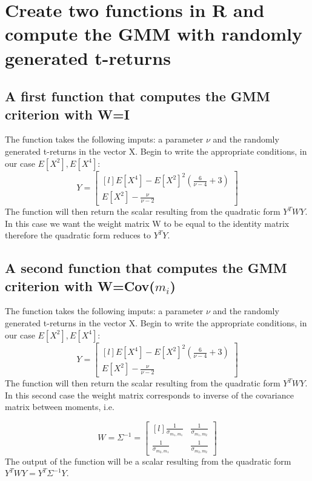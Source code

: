 \section{Create two functions in R and compute the GMM with randomly generated t-returns}

\subsection{A first function that computes the GMM criterion with W=I}
The function takes the following imputs: a parameter $\nu$ and the randomly generated t-returns in the vector X. Begin to write the appropriate conditions, in our case $E[X^2], E[X^4]$:
\begin{equation*}
    Y=    
    \begin{bmatrix}[l]
    E[X^4]-E[X^2]^2(\frac{6}{\nu-4}+3)  \\
    E[X^2]-\frac{\nu}{\nu-2}
    \end{bmatrix}
\end{equation*}
The function will then return the scalar resulting from the quadratic form $Y^TWY$. In this case we want the weight matrix W to be equal to the identity matrix therefore the quadratic form reduces to $Y^TY$.


\subsection{A second function that computes the GMM criterion with W=Cov($m_i$)}
The function takes the following imputs: a parameter $\nu$ and the randomly generated t-returns in the vector X. Begin to write the appropriate conditions, in our case $E[X^2], E[X^4]$:
\begin{equation*}
    Y=    
    \begin{bmatrix}[l]
    E[X^4]-E[X^2]^2(\frac{6}{\nu-4}+3)  \\
    E[X^2]-\frac{\nu}{\nu-2}
    \end{bmatrix}
\end{equation*}
The function will then return the scalar resulting from the quadratic form $Y^TWY$. In this second case the weight matrix corresponds to inverse of the covariance matrix between moments, i.e.

\begin{equation*}
    W=\Sigma^{-1}=
    \begin{bmatrix}[l]
        \frac{1}{\sigma_{m_1,m_1}}    &\frac{1}{\sigma_{m_1,m_2}} \\
        \frac{1}{\sigma_{m_2,m_1}}    &\frac{1}{\sigma_{m_2,m_2}}
    \end{bmatrix}
\end{equation*}
The output of the function will be a scalar resulting from the quadratic form $Y^TWY=Y^T\Sigma^{-1}Y$.
\\
\\

